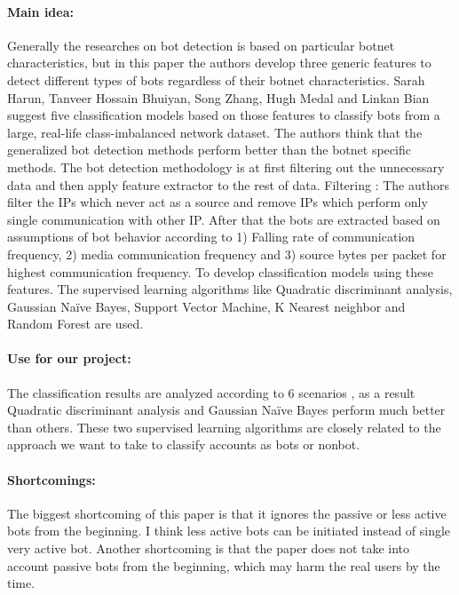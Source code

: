 \paragraph{Main idea:}
Generally the researches on bot detection is based on particular botnet characteristics, but in this paper the authors develop three generic features to detect different types of bots regardless of their botnet characteristics. Sarah Harun, Tanveer Hossain Bhuiyan, Song Zhang, Hugh Medal and Linkan Bian~\cite{harun2017bot} suggest five classification models based on those features to classify bots from a large, real-life class-imbalanced network dataset. The authors think that the generalized bot detection methods perform better than the botnet specific methods. 
The bot detection methodology is at first filtering out the unnecessary data and then apply feature extractor to the rest of data. Filtering : The authors filter the IPs which never act as a source and remove IPs which perform only single communication with other IP. After that the bots are extracted based on assumptions of bot behavior according to 1) Falling rate of communication frequency, 2) media communication frequency and 3) source bytes per packet for highest communication frequency.  To develop classification models using these features. The supervised learning algorithms like Quadratic discriminant analysis, Gaussian Naïve Bayes, Support Vector Machine, K Nearest neighbor and Random Forest are used. 
\paragraph{Use for our project:}
The classification results are analyzed according to 6 scenarios , as a result Quadratic discriminant analysis and Gaussian Naïve Bayes perform much better than others. These two supervised learning algorithms are closely related to the approach we want to take to classify accounts as bots or nonbot.  
\paragraph{Shortcomings:}
The biggest shortcoming of this paper is that it ignores the passive or less active bots from the  beginning. I think less active bots can be initiated instead of single very active bot. Another shortcoming is that the paper does not take into account passive bots from the beginning, which may harm the real users by the time. 
